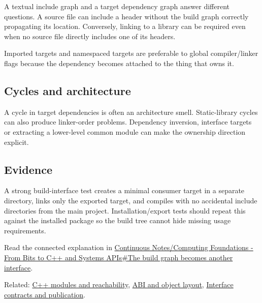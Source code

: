 A textual include graph and a target dependency graph answer different questions. A source file can include a header without the build graph correctly propagating its location. Conversely, linking to a library can be required even when no source file directly includes one of its headers.

Imported targets and namespaced targets are preferable to global compiler/linker flags because the dependency becomes attached to the thing that owns it.

\subsection{Cycles and architecture}\label{appendix-3327b8977adf-cycles-and-architecture}

A cycle in target dependencies is often an architecture smell. Static-library cycles can also produce linker-order problems. Dependency inversion, interface targets or extracting a lower-level common module can make the ownership direction explicit.

\subsection{Evidence}\label{appendix-3327b8977adf-evidence}

A strong build-interface test creates a minimal consumer target in a separate directory, links only the exported target, and compiles with no accidental include directories from the main project. Installation/export tests should repeat this against the installed package so the build tree cannot hide missing usage requirements.

Read the connected explanation in \hyperref[01-foundations-i-ch008-the-build-graph-becomes-another-interface]{Continuous Notes/Computing Foundations - From Bits to C++ and Systems APIs\#The build graph becomes another interface}.

Related: \hyperref[appendix-410a611a5b8d]{C++ modules and reachability}, \hyperref[appendix-c4ac6bb0fff8]{ABI and object layout}, \hyperref[appendix-fdae7ff0a23f]{Interface contracts and publication}.
